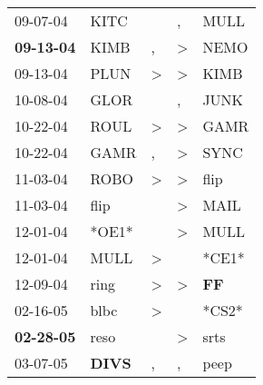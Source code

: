 \begin{supertabular}{p{0.07\textwidth}p{0.06\textwidth}p{0.02\textwidth}p{0.02\textwidth}p{0.06\textwidth}}
          09-07-04\textsuperscript{} &           KITC\textsuperscript{} &                  &                , &           MULL\textsuperscript{} \\
 \textbf{09-13-04\textsuperscript{}} &           KIMB\textsuperscript{} &                , &     \textgreater &           NEMO\textsuperscript{} \\
          09-13-04\textsuperscript{} &           PLUN\textsuperscript{} &     \textgreater &     \textgreater &           KIMB\textsuperscript{} \\
          10-08-04\textsuperscript{} &           GLOR\textsuperscript{} &                  &                , &           JUNK\textsuperscript{} \\
          10-22-04\textsuperscript{} &           ROUL\textsuperscript{} &     \textgreater &     \textgreater &           GAMR\textsuperscript{} \\
          10-22-04\textsuperscript{} &           GAMR\textsuperscript{} &                , &     \textgreater &           SYNC\textsuperscript{} \\
          11-03-04\textsuperscript{} &           ROBO\textsuperscript{} &     \textgreater &     \textgreater &           flip\textsuperscript{} \\
          11-03-04\textsuperscript{} &           flip\textsuperscript{} &                  &     \textgreater &           MAIL\textsuperscript{} \\
          12-01-04\textsuperscript{} &                            *OE1* &                  &     \textgreater &           MULL\textsuperscript{} \\
          12-01-04\textsuperscript{} &           MULL\textsuperscript{} &     \textgreater &                  &                            *CE1* \\
          12-09-04\textsuperscript{} &           ring\textsuperscript{} &     \textgreater &     \textgreater &    \textbf{FF\textsuperscript{}} \\
          02-16-05\textsuperscript{} &           blbc\textsuperscript{} &     \textgreater &                  &                            *CS2* \\
 \textbf{02-28-05\textsuperscript{}} &           reso\textsuperscript{} &                  &     \textgreater &           srts\textsuperscript{} \\
          03-07-05\textsuperscript{} &  \textbf{DIVS\textsuperscript{}} &                , &                , &           peep\textsuperscript{} \\

\end{supertabular}
